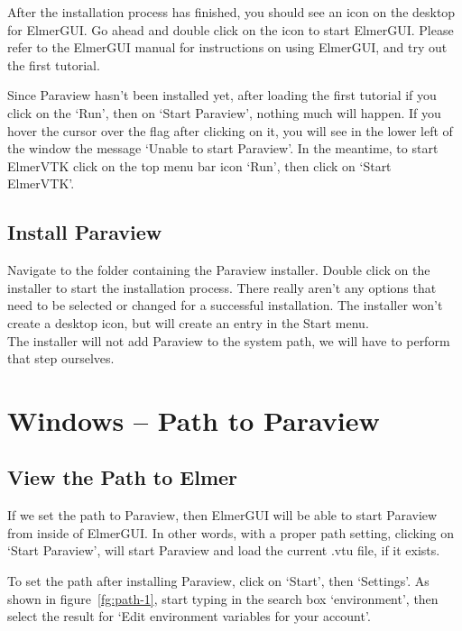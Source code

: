 After the installation process has finished, you should see an icon on the desktop for ElmerGUI.  Go ahead and double click on the icon to start ElmerGUI.  Please refer to the ElmerGUI manual for instructions on using ElmerGUI, and try out the first tutorial. 

Since Paraview hasn't been installed yet, after loading the first tutorial  if you click on the `Run', then on `Start Paraview', nothing much will happen.  If you hover the cursor over the flag after clicking on it, you will see in the lower left of the window the message `Unable to start Paraview'.  In the meantime, to start ElmerVTK click on the top menu bar icon `Run', then click on `Start ElmerVTK'.


\section{Install Paraview}

Navigate to the folder containing the Paraview installer.  Double click on the installer to start the installation process.  There really aren't any options that need to be selected or changed for a successful installation.  The installer won't create a desktop icon, but will create an entry in the Start menu.\\

The installer will not add Paraview to the system path, we will have to perform that step ourselves.



\chapter{Windows -- Path to Paraview}

\section{View the Path to Elmer}

If we set the path to Paraview, then ElmerGUI will be able to start Paraview from inside of ElmerGUI.  In other words, with a proper path setting, clicking on `Start Paraview', will start Paraview and load the current .vtu file, if it exists.

To set the path after installing Paraview, click on `Start', then `Settings'.  As shown in figure~\ref{fg:path-1}, start typing in the search box `environment', then select the result for `Edit environment variables for your account'.  

